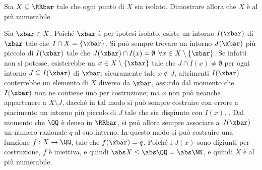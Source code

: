 \documentclass[11pt]{article}
\begin{document}
	\begin{exercise}
		Sia $X \subseteq \RRbar$ tale che ogni punto di $X$ sia isolato.
		Dimostrare allora che $X$ è al più numerabile.
	\end{exercise}

	\begin{solution}
		Sia $\xbar \in X$. Poiché $\xbar$ è per ipotesi isolato, esiste
		un intorno $I(\xbar)$ di $\xbar$ tale che $I \cap X = \{\xbar\}$. Si può
		sempre trovare un intorno $J(\xbar)$ più piccolo di $I(\xbar)$ tale
		che $J(\xbar) \cap I(x) = \emptyset$ $\forall x \in X \setminus \{\xbar\}$.
		Se infatti non si potesse, esisterebbe un $x \in X \setminus \{\xbar\}$ tale che $J \cap I(x) \neq \emptyset$ per ogni
		intorno $J \subseteq I(\xbar)$ di $\xbar$: sicuramente tale $x \notin J$,
		altrimenti $I(\xbar)$ conterrebbe un elemento di $X$ diverso
		da $\xbar$, assurdo dal momento che $I(\xbar)$ non ne contiene uno
		per costruzione; ma $x$ non può neanche appartenere a $X \setminus J$,
		dacché in tal modo si può sempre costruire con errore a piacimento
		un intorno più piccolo di $J$ tale che sia disgiunto con $I(x)$,
		\Lightning. Dal momento che $\QQ$ è denso in $\RRbar$, si può allora
		sempre associare a $J(\xbar)$ un numero razionale $q$ al suo interno.
		In questo modo si può costruire una funzione $f : X \to \QQ$,
		tale che $f(\xbar) = q$. Poiché i $J(x)$ sono digiunti per costruzione,
		$f$ è iniettiva, e quindi $\abs X \leq \abs \QQ = \abs \NN$, e quindi
		$X$ è al più numerabile. %
	\end{solution}
\end{document}

